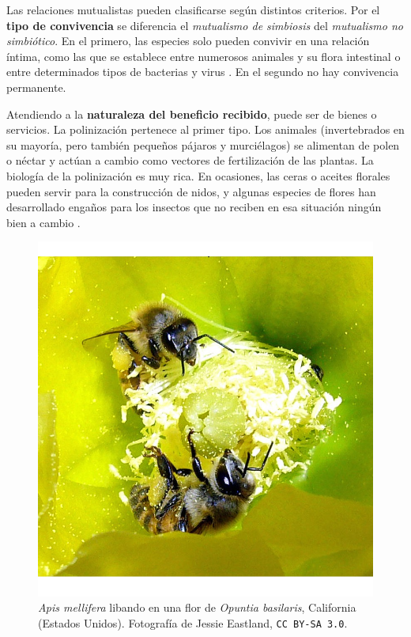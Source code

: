 Las relaciones mutualistas pueden clasificarse según distintos criterios. Por el \textbf{tipo de convivencia} se diferencia el \textit{mutualismo de simbiosis} del \textit{mutualismo no simbiótico}. En el primero, las especies solo pueden convivir en una relación íntima, como las que se establece entre numerosos animales y su flora intestinal o entre determinados tipos de bacterias y virus \cite{moran2005players, thrall2007coevolution}. En el segundo no hay convivencia permanente.
	
Atendiendo a la \textbf{naturaleza del beneficio recibido}, puede ser de bienes o servicios. La polinización pertenece al primer tipo. Los animales (invertebrados en su mayoría, pero también pequeños pájaros y murciélagos) se alimentan de polen o néctar y actúan a cambio como vectores de fertilización de las plantas. La biología de la polinización es muy rica. En ocasiones, las ceras o aceites florales pueden servir para la construcción de nidos, y algunas especies de flores han desarrollado engaños para los insectos que no reciben en esa situación ningún bien a cambio \cite{rech2014biologia}.

\begin{figure}[h!]
\centering
\includegraphics[scale=0.5]{Figures/INTRO_Pollination.jpg}
\caption{\textit{Apis mellifera} libando en una flor de \textit{Opuntia basilaris}, California (Estados Unidos). Fotografía de Jessie Eastland, \small{\texttt{CC BY-SA 3.0}}.}
\label{fig:INTRO_Pollination}
\end{figure}


